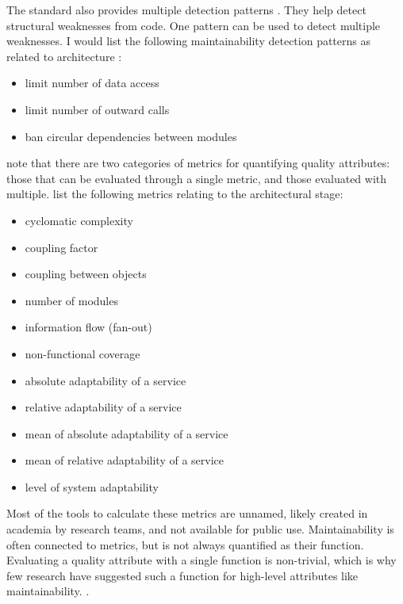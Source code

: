 \documentclass[utf8,english]{gradu3}
\begin{document}
The standard also provides multiple detection patterns \parencite[2]{ISO5055}.
They help detect structural weaknesses from code. One
pattern can be used to detect multiple weaknesses. I would list the following
maintainability detection patterns as related to architecture
\parencite[48-54]{ISO5055}:
\begin{itemize}
  \item limit number of data access
  \item limit number of outward calls
  \item ban circular dependencies between modules
\end{itemize}

\textcite[63]{Arvanitou2017} note that there are two categories of metrics for
quantifying quality attributes: those that can be evaluated through a single
metric, and those evaluated with multiple. \textcite[66]{Arvanitou2017} list the
following metrics relating to the architectural stage:
\begin{itemize}
  \item cyclomatic complexity
  \item coupling factor
  \item coupling between objects
  \item number of modules
  \item information flow (fan-out)
  \item non-functional coverage
  \item absolute adaptability of a service
  \item relative adaptability of a service
  \item mean of absolute adaptability of a service
  \item mean of relative adaptability of a service
  \item level of system adaptability
\end{itemize}

Most of the tools to calculate these metrics are unnamed, likely created in
academia by research teams, and not available for public use.
Maintainability is often connected to metrics, but is
not always quantified as their function. Evaluating a quality attribute with a
single function is non-trivial, which is why few research have suggested such a
function for high-level attributes like maintainability.
\parencite[67]{Arvanitou2017}.
\end{document}
